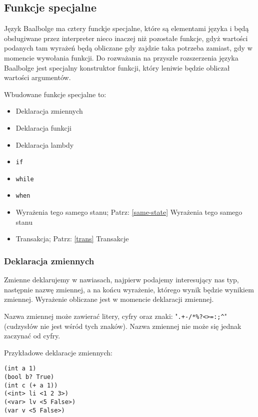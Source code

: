 \documentclass{article}
\begin{document}
\subsection{Funkcje specjalne}\label{func:special}

Język Baalbolge ma cztery funckje specjalne, które są elementami języka i będą obsługiwane przez interpreter nieco inaczej niż pozostałe funkcje, gdyż wartości podanych tam wyrażeń będą obliczane gdy zajdzie taka potrzeba zamiast, gdy w momencie wywołania funkcji. Do rozważania na przyszłe rozszerzenia języka Baalbolge jest specjalny konstruktor funkcji, który leniwie będzie obliczał wartości argumentów.

Wbudowane funkcje specjalne to:

\begin{itemize}
    \item Deklaracja zmiennych
    \item Deklaracja funkcji
    \item Deklaracja lambdy
    \item \texttt{if}
    \item \texttt{while}
    \item \texttt{when}
    \item Wyrażenia tego samego stanu; Patrz: \ref{same-state} Wyrażenia tego samego stanu
    \item Transakcja; Patrz: \ref{trans} Transakcje
\end{itemize}

\subsubsection{Deklaracja zmiennych}\label{var:decl}

Zmienne deklarujemy w nawiasach, najpierw podajemy interesujący nas typ, następnie nazwę zmiennej, a na końcu wyrażenie, którego wynik będzie wynikiem zmiennej. Wyrażenie obliczane jest w momencie deklaracji zmiennej.

Nazwa zmiennej może zawierać litery, cyfry oraz znaki: "\texttt{.+-/*\%?<>=:;\^}" (cudzysłów nie jest wśród tych znaków). Nazwa zmiennej nie może się jednak zaczynać od cyfry.

Przykładowe deklaracje zmiennych:

\begin{lstlisting}
(int a 1)
(bool b? True)
(int c (+ a 1))
(<int> li <1 2 3>)
(<var> lv <5 False>)
(var v <5 False>)
\end{lstlisting}
\end{document}
